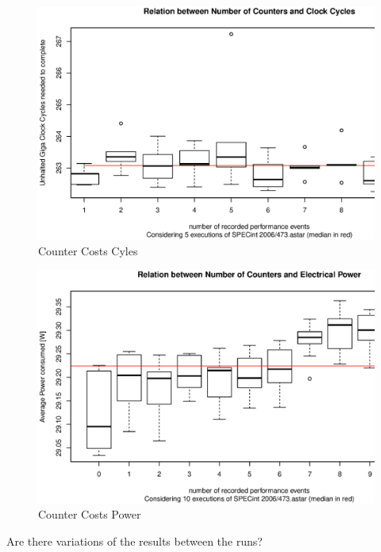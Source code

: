 \begin{figure}
  \centering
    \includegraphics[width=\textwidth]{fig/ctr-csts-cycles.eps}
  \caption{Counter Costs Cyles}
  \label{fig:ctr-costs-cycles}
\end{figure}

\begin{figure}
  \centering
    \includegraphics[width=\textwidth]{fig/ctr-csts-power.eps}
  \caption{Counter Costs Power}
  \label{fig:ctr-costs-power}
\end{figure}


\label{sec:variation}

Are there variations of the results between the runs?
